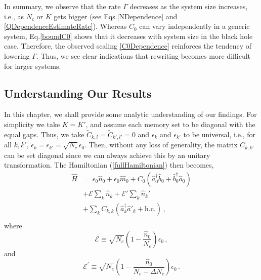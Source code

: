 \documentclass[aps,prd,reprint,superscriptaddress,nofootinbib]{revtex4-2}
\makeatletter
\newcommand*{\ie}{i.e., }
\newcommand*{\Eq}{Eq.\@\xspace}
\newcommand*{\Eqs}{Eqs.\@\xspace}
\makeatother
\begin{document}
In summary, we observe that the rate $\Gamma$ decreases as the system size increases, \ie as $N_c$ or $K$ gets bigger (see \Eqs \eqref{NDependence} and \eqref{QDependenceEstimateRate}). Whereas $C_0$ can vary independently in a generic system, \Eq \eqref{boundC0} shows that it decreases with 
system size in the black hole case. Therefore, the observed scaling \eqref{C0Dependence} reinforces the tendency of lowering $\Gamma$. Thus, we see clear indications that rewriting becomes more difficult for larger systems.

 \subsection{Understanding Our Results} 

In this chapter, we shall provide some analytic understanding of our findings. 
For simplicity we take $K=K'$,  and assume each memory 
set to be diagonal  with the equal gaps. Thus, we take $\tilde{C}_{k,l} = 
\tilde{C}_{k',l'}= 0$ and  $\epsilon_k$ and $\epsilon_{k'}$ to be universal, i.e.,  for all $k,k'$, 
$\epsilon_{k} = \epsilon_{k'} = \sqrt{N_c}\epsilon_0$.  
Then, without any loss of generality, the matrix  
$C_{k,k'}$ can be set diagonal since we can always achieve this by an unitary transformation.
The Hamiltonian  (\ref{fullHamiltonian}) then becomes,  
\begin{align}
\hat{H} &= \epsilon_0 \hat{n}_0 + \epsilon_0 \hat{m}_0  +  C_0\left( \hat{a}_0^\dagger \hat{b}_0 + \hat{b}_0^\dagger \hat{a}_0\right) 
\nonumber\\
& +  {\mathcal E} \sum_{k}  \hat{n}_k
+  {\mathcal E}' \sum_{k}  \hat{n}_k'  
\nonumber\\
& + \sum_{k}  C_{k,k}\left( \hat{a}_k^\dagger \hat{a}'_{k} +  \text{h.c.}\right) \,, 
\nonumber\\
\label{SimpleHamiltonian}
\end{align}
where 
\begin{equation} 
{\mathcal E} \equiv \sqrt{N_c}\left(1-\frac{\hat{n}_0}{N_c}\right)\epsilon_0\,, 
\end{equation}
and 
\begin{equation} 
{\mathcal E}^{'} \equiv   \sqrt{N_c}\left(1-\frac{\hat{n}_0}{N_c-\Delta N_c}\right)\epsilon_{0} \,.
\end{equation}
\end{document}

